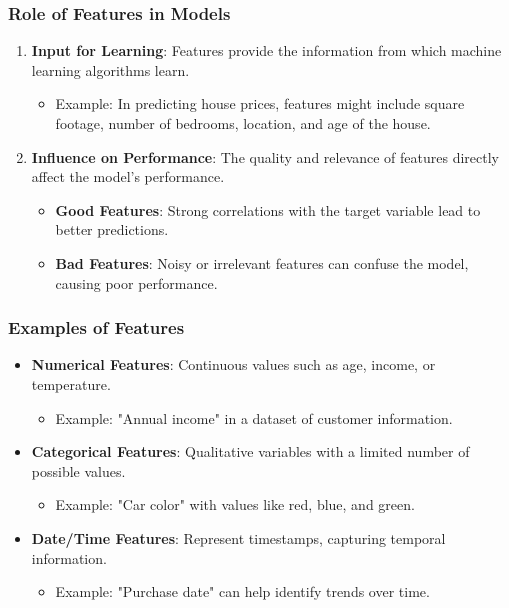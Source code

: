 \documentclass[aspectratio=169]{beamer}
\begin{document}
\begin{frame}[fragile]
    \frametitle{Role of Features in Models}
    \begin{enumerate}
        \item \textbf{Input for Learning}: Features provide the information from which machine learning algorithms learn. 
        \begin{itemize}
            \item Example: In predicting house prices, features might include square footage, number of bedrooms, location, and age of the house.
        \end{itemize}
        
        \item \textbf{Influence on Performance}: The quality and relevance of features directly affect the model's performance.
        \begin{itemize}
            \item \textbf{Good Features}: Strong correlations with the target variable lead to better predictions.
            \item \textbf{Bad Features}: Noisy or irrelevant features can confuse the model, causing poor performance.
        \end{itemize}
    \end{enumerate}
\end{frame}

\begin{frame}[fragile]
    \frametitle{Examples of Features}
    \begin{itemize}
        \item \textbf{Numerical Features}: Continuous values such as age, income, or temperature.
        \begin{itemize}
            \item Example: "Annual income" in a dataset of customer information.
        \end{itemize}
        
        \item \textbf{Categorical Features}: Qualitative variables with a limited number of possible values.
        \begin{itemize}
            \item Example: "Car color" with values like red, blue, and green.
        \end{itemize}
        
        \item \textbf{Date/Time Features}: Represent timestamps, capturing temporal information.
        \begin{itemize}
            \item Example: "Purchase date" can help identify trends over time.
        \end{itemize}
    \end{itemize}
\end{frame}
\end{document}
